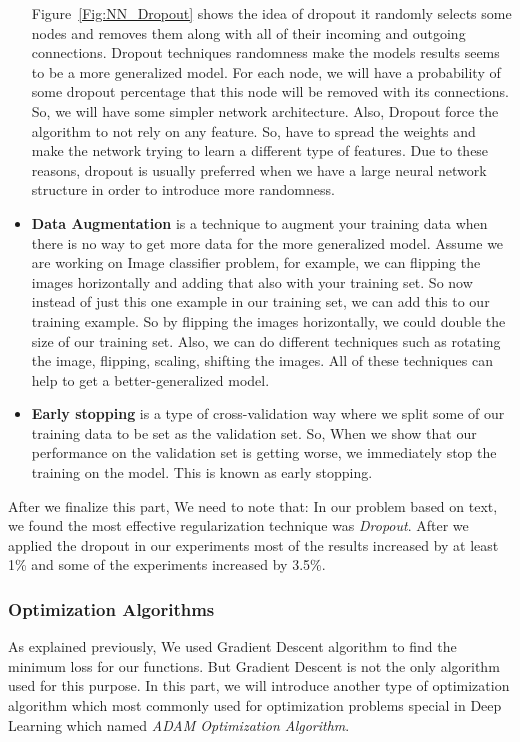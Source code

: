 \begin{itemize}
Figure~\ref{Fig:NN_Dropout} shows the idea of dropout it randomly selects some nodes and removes them along with all of their incoming and outgoing connections. Dropout techniques randomness make the models results seems to be a more generalized model. For each node, we will have a probability of some dropout percentage that this node will be removed with its connections. So, we will have some simpler network architecture. Also, Dropout force the algorithm to not rely on any feature. So, have to spread the weights and make the network trying to learn a different type of features. Due to these reasons, dropout is usually preferred when we have a large neural network structure in order to introduce more randomness.

\item \textbf{Data Augmentation} is a technique to augment your training data when there is no way to get more data for the more generalized model. Assume we are working on Image classifier problem, for example, we can flipping the images horizontally and adding that also with your training set. So now instead of just this one example in our training set, we can add this to our training example. So by flipping the images horizontally, we could double the size of our training set. Also, we can do different techniques such as rotating the image, flipping, scaling, shifting the images. All of these techniques can help to get a better-generalized model.

\item \textbf{Early stopping} is a type of cross-validation way where we split some of our training data to be set as the validation set. So, When we show that our performance on the validation set is getting worse, we immediately stop the training on the model. This is known as early stopping.
\end{itemize}

After we finalize this part, We need to note that: In our problem based on text, we found the most effective regularization technique was \textit{Dropout}. After we applied the dropout in our experiments most of the results increased by at least 1\% and some of the experiments increased by 3.5\%.

\subsubsection{Optimization Algorithms}
As explained previously, We used Gradient Descent algorithm to find the minimum loss for our functions. But Gradient Descent is not the only algorithm used for this purpose. In this part, we will introduce another type of optimization algorithm which most commonly used for optimization problems special in Deep Learning which named \textit{ADAM Optimization Algorithm}. 

